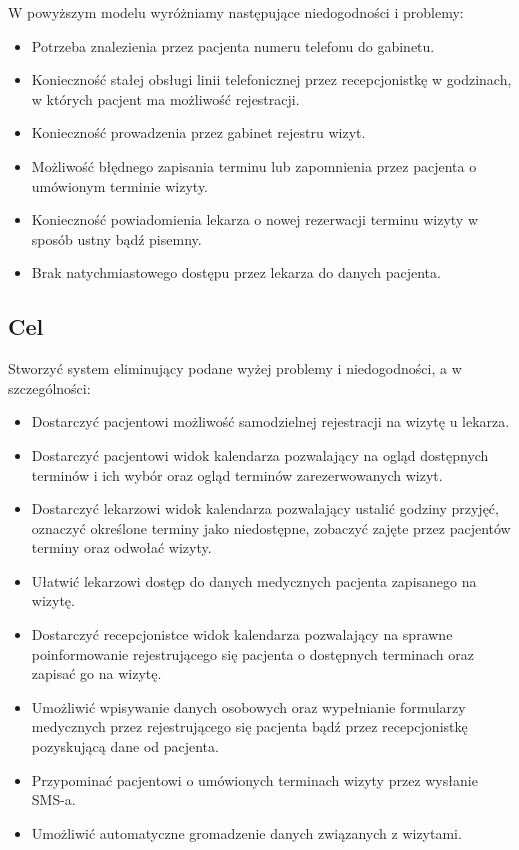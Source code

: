 \documentclass[polish,12pt]{aghthesis}
\begin{document}
W powyższym modelu wyróżniamy następujące niedogodności i problemy:
\begin{itemize}
  \item Potrzeba znalezienia przez pacjenta numeru telefonu do gabinetu.
  \item Konieczność stałej obsługi linii telefonicznej przez recepcjonistkę w godzinach, w których pacjent ma możliwość rejestracji.
  \item Konieczność prowadzenia przez gabinet rejestru wizyt.
  \item Możliwość błędnego zapisania terminu lub zapomnienia przez pacjenta o umówionym terminie wizyty.
  \item Konieczność powiadomienia lekarza o nowej rezerwacji terminu wizyty w sposób ustny bądź pisemny.
  \item Brak natychmiastowego dostępu przez lekarza do danych pacjenta.
\end{itemize}

\subsection{Cel}
Stworzyć system eliminujący podane wyżej problemy i niedogodności, a w szczególności:

\begin{itemize}
  \item Dostarczyć pacjentowi możliwość samodzielnej rejestracji na wizytę u lekarza.
  \item Dostarczyć pacjentowi widok kalendarza pozwalający na ogląd dostępnych terminów i ich wybór oraz ogląd terminów zarezerwowanych wizyt.
  \item Dostarczyć lekarzowi widok kalendarza pozwalający ustalić godziny przyjęć, oznaczyć określone terminy jako niedostępne, zobaczyć zajęte przez pacjentów terminy oraz odwołać wizyty.
  \item Ułatwić lekarzowi dostęp do danych medycznych pacjenta zapisanego na wizytę.
  \item Dostarczyć recepcjonistce widok kalendarza pozwalający na sprawne poinformowanie rejestrującego się pacjenta o dostępnych terminach oraz zapisać go na wizytę.
  \item Umożliwić wpisywanie danych osobowych oraz wypełnianie formularzy medycznych przez rejestrującego się pacjenta bądź przez recepcjonistkę pozyskującą dane od pacjenta.
  \item Przypominać pacjentowi o umówionych terminach wizyty przez wysłanie SMS-a.
  \item Umożliwić automatyczne gromadzenie danych związanych z wizytami.
\end{itemize}
\end{document}
